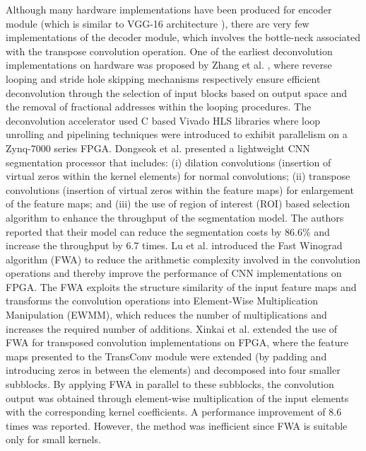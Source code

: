 \documentclass[journal]{IEEEtran}
\begin{document}
Although many hardware implementations have been produced for encoder module (which is similar to VGG-16 architecture \cite{inproceedings8}), there are very few implementations of the decoder module, which involves the bottle-neck associated with the transpose convolution operation. One of the earliest deconvolution implementations on hardware was proposed by Zhang et al. \cite{article4}, where reverse looping and stride hole skipping mechanisms respectively ensure efficient deconvolution through the selection of input blocks based on output space and the removal of fractional addresses within the looping procedures. The deconvolution accelerator used C based Vivado HLS libraries where loop unrolling and pipelining techniques were introduced to exhibit parallelism on a Zynq-7000 series FPGA.
Dongseok et al. \cite{2019DT} presented a lightweight CNN segmentation processor that includes: (i) dilation convolutions (insertion of virtual zeros within the kernel elements) for normal convolutions; (ii) transpose convolutions (insertion of virtual zeros within the feature maps) for enlargement of the feature maps; and (iii) the use of region of interest (ROI) based selection algorithm to enhance the throughput of the segmentation model. The authors reported that their model can reduce the segmentation costs by 86.6\% and increase the throughput by 6.7 times. Lu et al. \cite{inproceedings8} introduced the Fast Winograd algorithm (FWA) to reduce the arithmetic complexity involved in the convolution operations and thereby improve the performance of CNN implementations on FPGA.  The FWA exploits the structure similarity of the input feature maps and transforms the convolution operations into Element-Wise Multiplication Manipulation (EWMM), which reduces the number of multiplications and  increases the required number of additions. Xinkai et al. \cite{inproceedings2} extended the use of FWA for transposed convolution implementations on FPGA, where the feature maps presented to the TransConv module were extended (by padding and introducing zeros in between the elements) and decomposed into four smaller subblocks. By applying FWA in parallel to these subblocks, the convolution output was obtained through  element-wise multiplication of the input elements with the corresponding kernel coefficients. A performance improvement of 8.6 times was reported. However, the method was inefficient since FWA is suitable only for small kernels.
\end{document}
